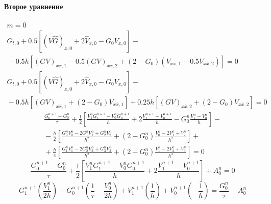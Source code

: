 \paragraph{Второе уравнение}
\begin{multline*}
m = 0 
\\
  G_{t,0} + 0.5 [(V \hat G)_{x,0} + 2 \hat V_{x,0} - G_0 V_{x,0}]
  -{} \\ {}-
  0.5h [
    (GV)_{x \bar x, 1} - 0.5(GV)_{x \bar x, 2} +
    (2 - G_0) (V_{x \bar x, 1} - 0.5V_{x \bar x, 2}) ] = 0
\\
  G_{t,0} + 0.5 [(V \hat G)_{x,0} + 2 \hat V_{x,0} - G_0 V_{x,0}]
  -{} \\ {}-
  0.5h  [(GV)_{x \bar x, 1} + (2 - G_0) V_{x \bar x, 1}] +
  0.25h [(GV)_{x \bar x, 2} + (2 - G_0) V_{x \bar x, 2}]  = 0
\end{multline*}
\begin{multline*}
  \frac{G_{0}^{n+1} - G_{0}^{n}}{\tau} 
  + \frac12 \left[
    \frac{V_{1}^{n} G_{1}^{n+1} - V_{0}^{n} G_{0}^{n+1}}{h} 
    + 2 \frac{V_{1}^{n+1} - V_{0}^{n+1}}{h} 
    - G_{0}^{n} \frac{V_{1}^{n} - V_{0}^{n}}{h} 
    \right] -{} \\ {}-
 \frac{h}{2} \left[
    \frac{G_{0}^{n} V_{0}^{n} - 2 G_{1}^{n} V_{1}^{n} + G_{2}^{n} V_{2}^{n}}{h^2} + 
    (2 - G_{0}^{n}) \frac{V_{0}^{n} - 2 V_{1}^{n} + V_{2}^{n}}{h^2}
    \right] +{} \\ {}+
 \frac{h}{4} \left[
    \frac{G_{1}^{n} V_{1}^{n} - 2 G_{2}^{n} V_{2}^{n} + G_{3}^{n} V_{3}^{n}}{h^2} + 
    (2 - G_{0}^{n}) \frac{V_{1}^{n} - 2 V_{2}^{n} + V_{3}^{n}}{h^2}
    \right] = 0
\end{multline*}
\begin{equation*}
  \frac{G_{0}^{n+1} - G_{0}^{n}}{\tau} 
  + \frac12 \left[
    \frac{V_{1}^{n} G_{1}^{n+1} - V_{0}^{n} G_{0}^{n+1}}{h} 
    + 2 \frac{V_{1}^{n+1} - V_{0}^{n+1}}{h} \right] + A_{0}^{n} = 0
\end{equation*}
\begin{equation*}
  G_{1}^{n+1} \left( \frac{V_{1}^{n}}{2h} \right) +
  G_{0}^{n+1} \left( \frac{1}{\tau} - \frac{V_{0}^{n}}{2h} \right) +
  V_{1}^{n+1} \left( \frac{1}{h} \right) +
  V_{0}^{n+1} \left(-\frac{1}{h} \right) = \frac{G_{0}^{n}}{\tau} - A_{0}^{n}
\end{equation*}


